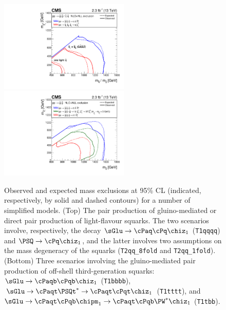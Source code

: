 \begin{figure}[h!]
  \begin{center}
    \includegraphics[width=0.55\textwidth]{figures/limits/v3/mixSUMMARY.pdf}
    \includegraphics[width=0.55\textwidth]{figures/limits/v3/gluinoSUMMARY.pdf} 
    \caption{Observed and expected mass exclusions at 95\% CL
      (indicated, respectively, by solid and dashed contours) for
      a number of simplified models. (Top) The pair production of
      gluino-mediated or direct pair production of light-flavour
      squarks. The two scenarios involve, respectively, the
      decay $\sGlu\ra\cPaq\cPq\chiz_1$ (\texttt{T1qqqq}) and
      $\PSQ\ra\cPq\chiz_1$, and the latter involves two assumptions on
      the mass degeneracy of the squarks (\texttt{T2qq\_8fold} and
      \texttt{T2qq\_1fold}). (Bottom) Three scenarios involving the
      gluino-mediated pair production of off-shell third-generation
      squarks: $\sGlu\ra\cPaqb\cPqb\chiz_1$ (\texttt{T1bbbb}),
      $\sGlu\ra\cPaqt\PSQt^*\ra\cPaqt\cPqt\chiz_1$ (\texttt{T1tttt}),
      and $\sGlu\ra\cPaqt\cPqb\chipm_1\ra\cPaqt\cPqb\PW^*\chiz_1$
      (\texttt{T1tbb}). 
}
    \label{fig:limits-sms-1} 
    \vspace{2.0cm} %
  \end{center}
\end{figure}

